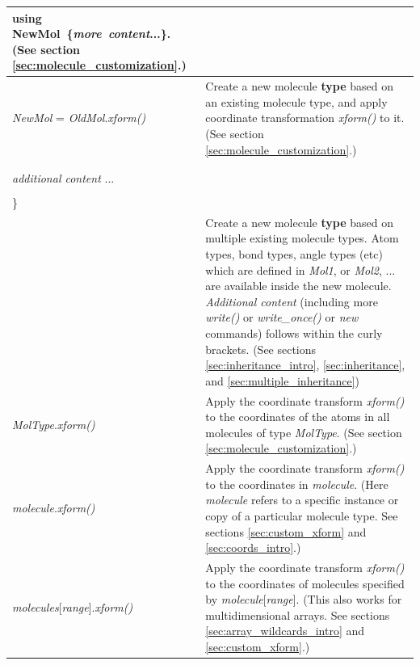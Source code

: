 \documentclass[11pt]{article}
\begin{document}
\begin{longtable}[h]{l|p{9cm}}
using \mbox{NewMol \{\textit{more\ content}...\}}.  
(See section \ref{sec:molecule_customization}.)
\\
\hline
\textit{NewMol} = \textit{OldMol}.\textit{xform()}
&
Create a new molecule \textbf{type} based on an existing molecule type,
and apply coordinate transformation \textit{xform()} to it.
(See section \ref{sec:molecule_customization}.)
\\
\hline
\begin{tabular}[t]{l}
\textit{NewMol} \textbf{inherits} \textit{Mol1} \textit{Mol2} ... \{ \\
\\
\hspace{0.35cm} \textit{additional content} ... \\
\\
\} \\
\end{tabular}
&
Create a new molecule \textbf{type} based on multiple existing molecule types.
Atom types, bond types, angle types (etc) which are defined in
\textit{Mol1}, or \textit{Mol2}, ... are available inside the
new molecule.
\textit{Additional content} 
(including more \textit{write()} or \textit{write\_once()}
or \textit{new} commands)
follows within the curly brackets.
(See sections \ref{sec:inheritance_intro},
\ref{sec:inheritance}, and \ref{sec:multiple_inheritance})
\\
\hline
\textit{MolType}.\textit{xform()}
&
Apply the coordinate transform \textit{xform()} to the coordinates 
of the atoms in all molecules of type \textit{MolType}.
(See section \ref{sec:molecule_customization}.)
\\
\hline
\textit{molecule}.\textit{xform()}
&
Apply the coordinate transform \textit{xform()} 
to the coordinates in \textit{molecule}.
(Here \textit{molecule} refers to a specific instance or copy of
 a particular molecule type.
See sections \ref{sec:custom_xform} and \ref{sec:coords_intro}.)
\\
\hline
\textit{molecules}[\textit{range}].\textit{xform()}
&
Apply the coordinate transform \textit{xform()} 
to the coordinates of molecules specified by
\mbox{\textit{molecule}[\textit{range}]}.
(This also works for multidimensional arrays.
See sections \ref{sec:array_wildcards_intro} and \ref{sec:custom_xform}.)
\\
\hline

\end{longtable}
\end{document}
